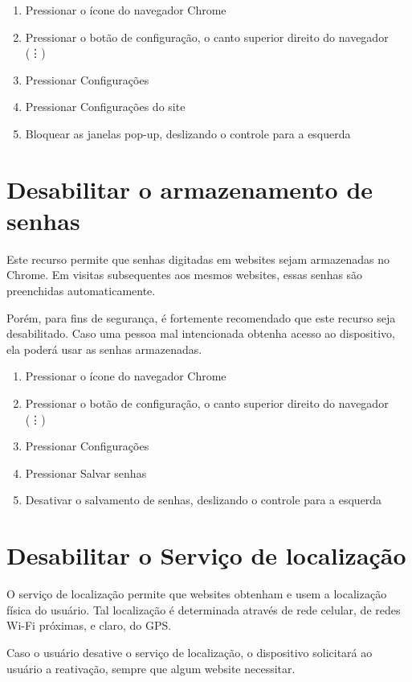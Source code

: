 \begin{enumerate}
\item Pressionar o \'icone do navegador Chrome
\item Pressionar o bot\~ao de configura\c c\~ao, o canto superior direito do navegador (\vdots)
\item Pressionar Configura\c c\~oes
\item Pressionar Configura\c c\~oes do site
\item Bloquear as janelas pop-up, deslizando o controle para a esquerda
\end{enumerate}

\section{Desabilitar o armazenamento de senhas}

Este recurso permite que senhas digitadas em websites sejam armazenadas no Chrome. Em visitas subsequentes aos mesmos websites, essas senhas s\~ao preenchidas automaticamente. 

Por\'em, para fins de seguran\c ca, \'e fortemente recomendado que este recurso seja desabilitado. Caso uma pessoa mal intencionada obtenha acesso ao dispositivo, ela poder\'a usar as senhas armazenadas.

\begin{enumerate}
\item Pressionar o \'icone do navegador Chrome
\item Pressionar o bot\~ao de configura\c c\~ao, o canto superior direito do navegador (\vdots)
\item Pressionar Configura\c c\~oes
\item Pressionar Salvar senhas
\item Desativar o salvamento de senhas, deslizando o controle para a esquerda
\end{enumerate}

\section{Desabilitar o Servi\c co de localiza\c c\~ao}

O servi\c co de localiza\c c\~ao permite que websites obtenham e usem a localiza\c c\~ao f\'isica do usu\'ario. Tal localiza\c c\~ao \'e determinada atrav\'es de rede celular, de redes Wi-Fi pr\'oximas, e claro, do GPS.
 
Caso o usu\'ario desative o servi\c co de localiza\c c\~ao, o dispositivo solicitar\'a ao usu\'ario a reativa\c c\~ao, sempre que algum website necessitar.


